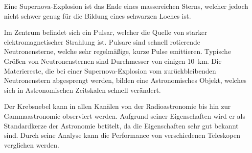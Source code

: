 Eine Supernova-Explosion ist das Ende eines massereichen Sterns,
welcher jedoch nicht schwer genug
für die Bildung eines schwarzen Loches ist.

Im Zentrum befindet sich ein Pulsar, welcher die Quelle von starker
elektromagnetischer Strahlung ist.
Pulsare sind schnell rotierende Neutronensterne,
welche sehr regelmäßige, kurze Pulse emittieren.
Typische Größen von Neutronensternen sind Durchmesser von einigen
\SI{10}{\kilo\meter}.
Die Materiereste, die bei einer Supernova-Explosion
vom zurückbleibenden Neutronenstern abgesprengt werden,
bilden eine Astronomisches Objekt,
welches sich in Astronomischen Zeitskalen schnell verändert.

Der Krebsnebel kann in allen Kanälen von der Radioastronomie bis hin zur Gammaastronomie observiert werden.
Aufgrund seiner Eigenschaften wird er als Standardkerze der Astronomie betitelt,
da die Eigenschaften sehr gut bekannt sind.
Durch seine Analyse kann die Performance von verschiedenen Teleskopen verglichen werden.
\clearpage
